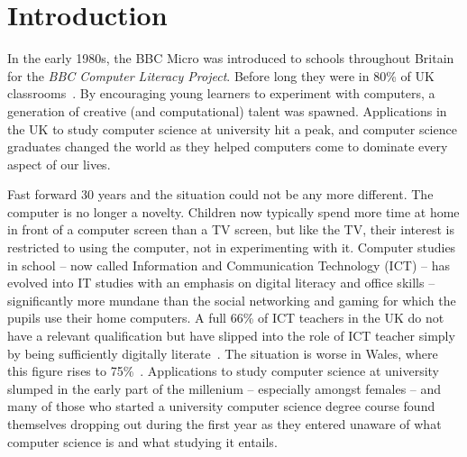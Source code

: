 \documentclass{sig-alternate}
\begin{document}
\section{Introduction}
In the early 1980s, the BBC Micro was introduced to schools throughout
Britain for the \emph{BBC Computer Literacy Project}.
Before long they were in 80\% of UK classrooms~\cite{vasko:1986}.
By encouraging young learners to experiment with computers, a generation
of creative (and computational) talent was spawned. Applications in
the UK to study computer science at university hit a peak, and
computer science graduates changed the world as they helped computers
come to dominate every aspect of our lives.

Fast forward 30 years and the situation could not be any more
different. The computer is no longer a novelty. Children now typically
spend more time at home in front of a computer screen than a TV screen, but
like the TV, their interest is restricted to using the computer, not
in experimenting with it. Computer studies in school -- now called
Information and Communication Technology (ICT) -- has evolved into IT
studies with an emphasis on digital literacy and office skills --
significantly more mundane than the social networking and gaming for
which the pupils use their home computers. A full 66\% of ICT teachers
in the UK do not have a relevant qualification but have slipped into
the role of ICT teacher simply by being sufficiently digitally
literate~\cite{RoyalSoc:2012}.
The situation is worse in Wales, where this figure rises to
75\%~\cite{GTCW:2008}.
Applications to
study computer science at university slumped in the early part of the
millenium -- especially amongst females -- and
many of those who started a university computer science degree course
found themselves dropping out during the first year as they entered
unaware of what computer science is and what studying it entails.
\end{document}
